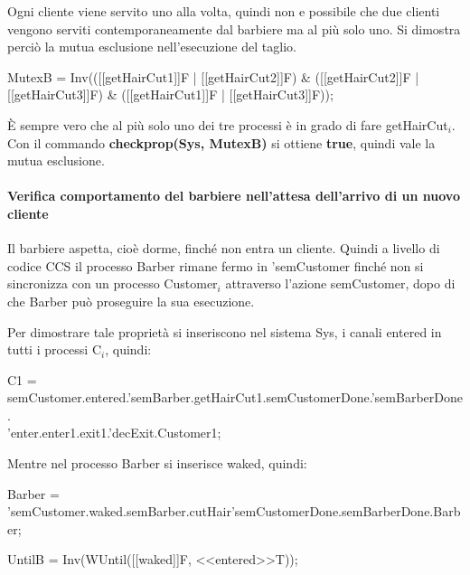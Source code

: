 Ogni cliente viene servito uno alla volta, quindi non e possibile che due clienti vengono serviti contemporaneamente dal barbiere ma al più solo uno. Si dimostra perciò la mutua esclusione nell'esecuzione del taglio.

\begin{center}
	\textsf{MutexB = Inv(([[getHairCut1]]F | [[getHairCut2]]F) \& ([[getHairCut2]]F | [[getHairCut3]]F) \& ([[getHairCut1]]F | [[getHairCut3]]F));}
\end{center}

È sempre vero che al più solo uno dei tre processi è in grado di fare \textsf{getHairCut$_{i}$}. Con il commando \textbf{checkprop(Sys, MutexB)} si ottiene \textbf{true}, quindi vale la mutua esclusione.


\paragraph{Verifica comportamento del barbiere nell'attesa dell'arrivo di un nuovo cliente }\mbox{}

Il barbiere aspetta, cioè dorme, finché non entra un cliente. Quindi a livello di codice CCS il processo \textsf{Barber} rimane fermo in \textsf{'semCustomer} finché non si sincronizza con un processo \textsf{Customer$_{i}$} attraverso l'azione \textsf{semCustomer}, dopo di che \textsf{Barber} può proseguire la sua esecuzione.

Per dimostrare tale proprietà si inseriscono nel sistema \textsf{Sys}, i canali \textsf{entered} in tutti i processi \textsf{C$_{i}$}, quindi:

\textsf{C1 = semCustomer.entered.'semBarber.getHairCut1.semCustomerDone.'semBarberDone.}\\
\textsf{'enter.enter1.exit1.'decExit.Customer1;}

Mentre nel processo \textsf{Barber} si inserisce \textsf{waked}, quindi:

\textsf{Barber = 'semCustomer.waked.semBarber.cutHair'semCustomerDone.semBarberDone.Barber;}

\begin{center}
	\textsf{UntilB = Inv(WUntil([[waked]]F, <<entered>>T));}
\end{center}


